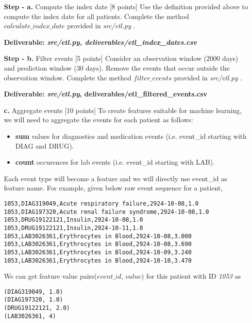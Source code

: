\documentclass[12pt]{article}
\begin{document}
\textbf{Step - a.} Compute the index date [8 points]
\newline
Use the definition provided above to compute the index date for all patients. Complete the method \textit{$calculate\_index\_date$} provided in \textit{src/etl.py} . 
\newline

\textbf{Deliverable: \textit{src/etl.py, deliverables/etl\_index\_dates.csv}}
\newline

\textbf{Step - b.} Filter events [5 points]
\newline
Consider an observation window (2000 days) and prediction window (30 days).
Remove the events that occur outside the observation window. Complete the method \textit{$filter\_events$} provided in \textit{src/etl.py} . 
\newline

\textbf{Deliverable: \textit{src/etl.py}, deliverables/etl\_filtered\_events.csv}
\newline

\textbf{c.} Aggregate events [10 points]
\newline
To create features suitable for machine learning, we will need to aggregate the events for each patient as follows:
\begin{itemize}
\item \textbf{sum} values for diagnostics and medication events (i.e. event\_id starting with DIAG and DRUG).  
\item \textbf{count} occurences for lab events (i.e. event\_id starting with LAB). 
\end{itemize}

Each event type will become a feature and we will directly use event\_id as feature name. For example, given below raw event sequence for a patient, \\

\begin{lstlisting}[frame=single]
1053,DIAG319049,Acute respiratory failure,2924-10-08,1.0
1053,DIAG197320,Acute renal failure syndrome,2924-10-08,1.0
1053,DRUG19122121,Insulin,2924-10-08,1.0
1053,DRUG19122121,Insulin,2924-10-11,1.0
1053,LAB3026361,Erythrocytes in Blood,2924-10-08,3.000
1053,LAB3026361,Erythrocytes in Blood,2924-10-08,3.690
1053,LAB3026361,Erythrocytes in Blood,2924-10-09,3.240
1053,LAB3026361,Erythrocytes in Blood,2924-10-10,3.470
\end{lstlisting}

We can get feature value pairs($event\_id$, $value$) for this patient with ID \textit{1053} as \\
\begin{lstlisting}[frame=single]
(DIAG319049, 1.0)
(DIAG197320, 1.0)
(DRUG19122121, 2.0)
(LAB3026361, 4)
\end{lstlisting}
\end{document}
